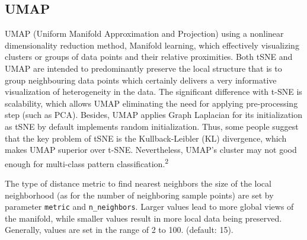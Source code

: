 \documentclass[]{article}
\begin{document}
\hypertarget{UMAP}{%
\subsection{UMAP}\label{UMAP}}

UMAP (Uniform Manifold Approximation and Projection) using a nonlinear dimensionality reduction method, Manifold learning, which effectively visualizing clusters or groups of data points and their relative proximities. Both tSNE and UMAP are intended to predominantly preserve the local structure that is to group neighbouring data points which certainly delivers a very informative visualization of heterogeneity in the data. The significant difference with t-SNE is scalability, which allows UMAP eliminating the need for applying pre-processing step (such as PCA). Besides, UMAP applies Graph Laplacian for its initialization as tSNE by default implements random initialization. Thus, some people suggest that the key problem of tSNE is the Kullback-Leibler (KL) divergence, which makes UMAP superior over t-SNE. Nevertheless, UMAP's cluster may not good enough for multi-class pattern classification.\textsuperscript{2}

The type of distance metric to find nearest neighbors the size of the local neighborhood (as for the number of neighboring sample points) are set by parameter \texttt{metric} and \texttt{n\_neighbors}. Larger values lead to more global views of the manifold, while smaller values result in more local data being preserved. Generally, values are set in the range of 2 to 100. (default: 15).
\end{document}
